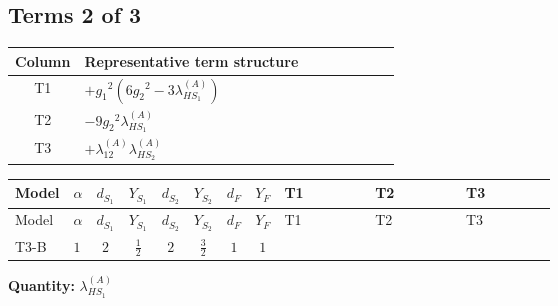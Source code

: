 \documentclass[8pt]{article}
\begin{document}
\begin{landscape}
\subsection*{Terms 2 of 3}
\begin{center}
\begin{tabular}{@{}c >{\raggedright\arraybackslash}p{0.82\linewidth}@{}}
\toprule
Column & Representative term structure \\
\midrule
T1 & \(\displaystyle +{g_1}^2 \left(6 {g_2}^2-3 {\lambda_{HS_1}^{(A)}}\right)\) \\
\midrule
T2 & \(\displaystyle -9 {g_2}^2 {\lambda_{HS_1}^{(A)}}\) \\
\midrule
T3 & \(\displaystyle +{\lambda_{12}^{(A)}} {\lambda_{HS_2}^{(A)}}\) \\
\midrule
\bottomrule
\end{tabular}
\end{center}
\smallskip
\tiny
\begin{longtable}{@{}llcccccc >{\raggedright\arraybackslash}p{0.21\linewidth} >{\raggedright\arraybackslash}p{0.21\linewidth} >{\raggedright\arraybackslash}p{0.21\linewidth}@{}}
\toprule
Model & $\alpha$ & $d_{S_1}$ & $Y_{S_1}$ & $d_{S_2}$ & $Y_{S_2}$ & $d_F$ & $Y_F$ & T1 & T2 & T3 \\
\midrule
\endfirsthead
\toprule
Model & $\alpha$ & $d_{S_1}$ & $Y_{S_1}$ & $d_{S_2}$ & $Y_{S_2}$ & $d_F$ & $Y_F$ & T1 & T2 & T3 \\
\midrule
\endhead
T3-B & $1$ & $2$ & $\frac{1}{2}$ & $2$ & $\frac{3}{2}$ & $1$ & $1$ & \scriptsize\adjustbox{max width=\linewidth}{$\begin{gathered} +{g_1}^2 \left(6 {g_2}^2-3 {\lambda_{HS_1}^{(A)}}\right)\end{gathered}$} & \scriptsize\adjustbox{max width=\linewidth}{$\begin{gathered} -9 {g_2}^2 {\lambda_{HS_1}^{(A)}}\end{gathered}$} & \scriptsize\adjustbox{max width=\linewidth}{$\begin{gathered} +{\lambda_{12}^{(A)}} {\lambda_{HS_2}^{(A)}}\end{gathered}$} \\
\midrule
\bottomrule
\end{longtable}
\clearpage
\noindent\textbf{Quantity: }$\lambda_{HS_1}^{(A)}$\par\smallskip

\end{landscape}
\end{document}
